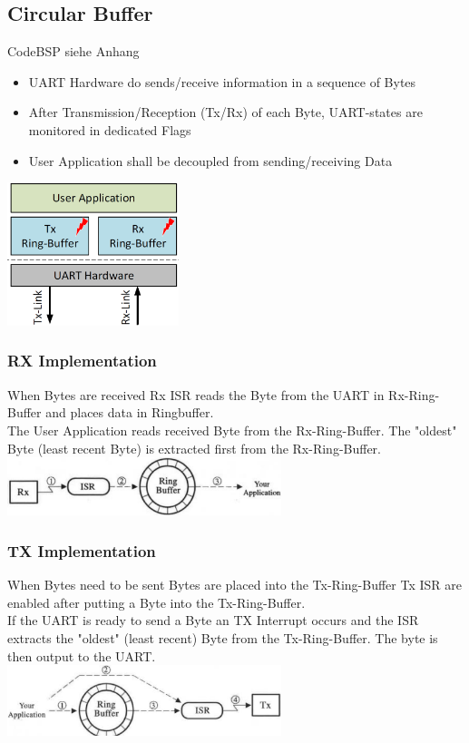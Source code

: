 \begin{minipage}{12cm}
    \subsection{Circular Buffer}
    CodeBSP siehe Anhang \label{CircularBuffer}
	\begin{itemize}
		\item \acs{UART} Hardware do sends/receive information in a sequence of Bytes
		\item After Transmission/Reception (Tx/Rx) of each Byte, \acs{UART}-states are monitored in dedicated Flags
		\item User Application shall be decoupled from sending/receiving Data
	\end{itemize}
\end{minipage}
\begin{minipage}{5cm}
	\includegraphics[width=5cm]{images/ringbuffer.png}
\end{minipage}
\begin{multicols}{2}
\subsubsection{RX Implementation}
When Bytes are received Rx \acs{ISR} reads the Byte from the \acs{UART} in Rx-Ring-Buffer and places data in Ringbuffer. \\
The User Application reads received Byte from the Rx-Ring-Buffer. The "oldest" Byte (least recent Byte) is extracted first from the Rx-Ring-Buffer.\\
\includegraphics[width=8cm]{images/rx_buffer.png}
\subsubsection{TX Implementation}
When Bytes need to be sent Bytes are placed into the Tx-Ring-Buffer Tx \acs{ISR} are enabled after putting a Byte into the Tx-Ring-Buffer. \\
If the \acs{UART} is ready to send a Byte an TX Interrupt occurs and the ISR extracts the "oldest" (least recent) Byte from the Tx-Ring-Buffer. The byte is then output to the \acs{UART}.\\
\includegraphics[width=8cm]{images/tx_buffer.png}
\end{multicols}
\clearpage

